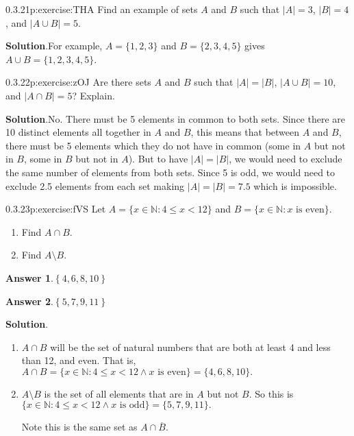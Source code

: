 \documentclass[twoside,11pt,]{book}
\newcommand{\blocktitlefont}{\relax}
\numberwithin{equation}{chapter}
\newcommand{\N}{\mathbb N}
\newcommand{\st}{:}
\newcommand{\lt}{<}
\begin{document}
\begin{divisionsolution}{0.3.21}{}{p:exercise:THA}%
Find an example of sets \(A\) and \(B\) such that \(|A| = 3\), \(|B| = 4\), and \(|A \cup B| = 5\).%
\par\smallskip%
\noindent\textbf{\blocktitlefont Solution}.\quad{}For example, \(A = \{1,2,3\}\) and \(B = \{2,3,4,5\}\) gives \(A\cup B = \{1,2,3,4,5\}\).%
\end{divisionsolution}%
\begin{divisionsolution}{0.3.22}{}{p:exercise:zOJ}%
Are there sets \(A\) and \(B\) such that \(|A| = |B|\), \(|A\cup B| = 10\), and \(|A\cap B| = 5\)? Explain.%
\par\smallskip%
\noindent\textbf{\blocktitlefont Solution}.\quad{}No. There must be 5 elements in common to both sets. Since there are 10 distinct elements all together in \(A\) and \(B\), this means that between \(A\) and \(B\), there must be 5 elements which they do not have in common (some in \(A\) but not in \(B\), some in \(B\) but not in \(A\)). But to have \(|A| = |B|\), we would need to exclude the same number of elements from both sets. Since 5 is odd, we would need to exclude 2.5 elements from each set making \(|A| = |B| = 7.5\) which is impossible.%
\end{divisionsolution}%
\begin{divisionsolution}{0.3.23}{}{p:exercise:fVS}%
Let \(A = \{x \in \N \st 4 \le x \lt 12\}\) and \(B = \{x \in \N \st x \text{ is even}\}\text{.}\)%
\begin{enumerate}[label=(\alph*)]
\item{}Find \(A \cap B\text{.}\)%
\item{}Find \(A \setminus B\text{.}\)%
\end{enumerate}
%
\par\smallskip%
\noindent\textbf{\blocktitlefont Answer 1}.\quad{}\(\left\{4,6,8,10\right\}\)%
\par\smallskip%
\noindent\textbf{\blocktitlefont Answer 2}.\quad{}\(\left\{5,7,9,11\right\}\)%
\par\smallskip%
\noindent\textbf{\blocktitlefont Solution}.\quad{}%
\begin{enumerate}[label=(\alph*)]
\item{}\(A \cap B\) will be the set of natural numbers that are both at least 4 and less than 12, and even. That is, \(A \cap B = \{x \in \N \st 4\le x \lt 12 \wedge x \text{ is even}\} = \{4, 6, 8, 10\}\text{.}\)%
\item{}\(A \setminus B\) is the set of all elements that are in \(A\) but not \(B\text{.}\) So this is \(\{x \in \N \st 4 \le x \lt 12 \wedge x \text{ is odd}\} = \{5,7,9,11\}\text{.}\)%
\par
Note this is the same set as \(A \cap \overline{B}\text{.}\)%
\end{enumerate}
%
\end{divisionsolution}%
\end{document}
